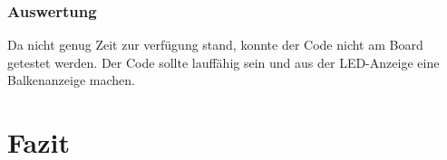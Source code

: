 \documentclass[12pt,a4paper]{article}
\begin{document}
\subsubsection*{Auswertung}

Da nicht genug Zeit zur verfügung stand, konnte der Code nicht am Board getestet werden. Der Code sollte lauffähig sein und aus der LED-Anzeige eine Balkenanzeige machen.

\section{Fazit}
\end{document}
